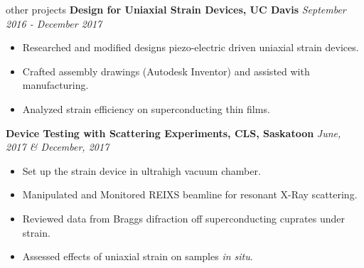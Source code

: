 \begin{rSection}
{other projects}
{\bf 
Design for Uniaxial Strain Devices,
UC Davis}
\hfill 
{\it September 2016 - December 2017}
\begin{itemize}
\item 
Researched and modified designs piezo-electric driven uniaxial strain devices.
\item
Crafted assembly drawings (Autodesk Inventor) and assisted with manufacturing.
\item 
Analyzed strain efficiency on superconducting thin films. 
\end{itemize}
\newpage 
{\bf 
Device Testing with Scattering Experiments,
CLS, Saskatoon}
\hfill 
{\it June, 2017 \& December, 2017}
\begin{itemize}
\item 
Set up the strain device in ultrahigh vacuum chamber. 
\item Manipulated and Monitored REIXS beamline for resonant X-Ray scattering. 
\item 
Reviewed data from Braggs difraction off superconducting cuprates under strain.
\item 
Assessed effects of uniaxial strain on samples 
\textit{in situ}.
\end{itemize}
\end{rSection}